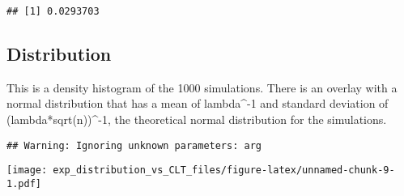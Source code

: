 \documentclass[]{article}
\newenvironment{Shaded}{\begin{snugshade}}{\end{snugshade}}
\newcommand{\KeywordTok}[1]{\textcolor[rgb]{0.13,0.29,0.53}{\textbf{#1}}}
\newcommand{\DataTypeTok}[1]{\textcolor[rgb]{0.13,0.29,0.53}{#1}}
\newcommand{\DecValTok}[1]{\textcolor[rgb]{0.00,0.00,0.81}{#1}}
\newcommand{\FloatTok}[1]{\textcolor[rgb]{0.00,0.00,0.81}{#1}}
\newcommand{\StringTok}[1]{\textcolor[rgb]{0.31,0.60,0.02}{#1}}
\newcommand{\OperatorTok}[1]{\textcolor[rgb]{0.81,0.36,0.00}{\textbf{#1}}}
\newcommand{\NormalTok}[1]{#1}
\begin{document}
\begin{verbatim}
## [1] 0.0293703
\end{verbatim}

\subsection{Distribution}\label{distribution}

This is a density histogram of the 1000 simulations. There is an overlay
with a normal distribution that has a mean of lambda\^{}-1 and standard
deviation of (lambda*sqrt(n))\^{}-1, the theoretical normal distribution
for the simulations.

\begin{Shaded}
\end{Shaded}

\begin{verbatim}
## Warning: Ignoring unknown parameters: arg
\end{verbatim}

\texttt{[image: exp\_distribution\_vs\_CLT\_files/figure-latex/unnamed-chunk-9-1.pdf]}
\end{document}
